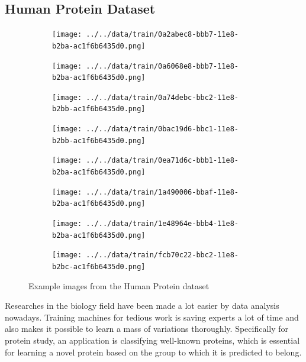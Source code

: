 \documentclass{article}
\begin{document}
\subsection{Human Protein Dataset}
\begin{figure}[h!]
    \centering
    \begin{subfigure}[b]{0.2\linewidth}
      \texttt{[image: ../../data/train/0a2abec8-bbb7-11e8-b2ba-ac1f6b6435d0.png]}
    \end{subfigure}
    \begin{subfigure}[b]{0.2\linewidth}
      \texttt{[image: ../../data/train/0a6068e8-bbb7-11e8-b2ba-ac1f6b6435d0.png]}
    \end{subfigure}
    \begin{subfigure}[b]{0.2\linewidth}
        \texttt{[image: ../../data/train/0a74debc-bbc2-11e8-b2bb-ac1f6b6435d0.png]}
    \end{subfigure}
    \begin{subfigure}[b]{0.2\linewidth}
        \texttt{[image: ../../data/train/0bac19d6-bbc1-11e8-b2bb-ac1f6b6435d0.png]}
    \end{subfigure}

    \begin{subfigure}[b]{0.2\linewidth}
        \texttt{[image: ../../data/train/0ea71d6c-bbb1-11e8-b2ba-ac1f6b6435d0.png]}
      \end{subfigure}
      \begin{subfigure}[b]{0.2\linewidth}
        \texttt{[image: ../../data/train/1a490006-bbaf-11e8-b2ba-ac1f6b6435d0.png]}
      \end{subfigure}
      \begin{subfigure}[b]{0.2\linewidth}
          \texttt{[image: ../../data/train/1e48964e-bbb4-11e8-b2ba-ac1f6b6435d0.png]}
      \end{subfigure}
      \begin{subfigure}[b]{0.2\linewidth}
          \texttt{[image: ../../data/train/fcb70c22-bbc2-11e8-b2bc-ac1f6b6435d0.png]}
      \end{subfigure}
    \caption{Example images from the Human Protein dataset}
  \end{figure}
  
Researches in the biology field have been made a lot easier by data analysis nowadays. Training machines for tedious work is saving experts a lot of time and also makes it possible to learn a mass of variations thoroughly. Specifically for protein study, an application is classifying well-known proteins, which is essential for learning a novel protein based on the group to which it is predicted to belong\cite{subcellular}. 
\end{document}
